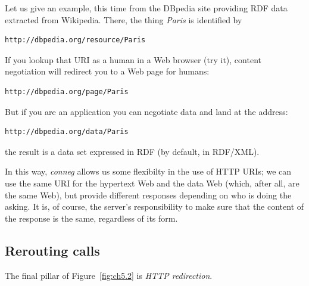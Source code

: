 Let us give an example, this time from the DBpedia site providing RDF
data extracted from Wikipedia. There, the thing \emph{Paris} is identified
by

\begin{lstlisting}
http://dbpedia.org/resource/Paris
\end{lstlisting}

If you lookup that URI as a human in a Web browser (try it), content
negotiation will redirect you to a Web page for humans:

\begin{lstlisting}
http://dbpedia.org/page/Paris
\end{lstlisting}

But if you are an application you can negotiate data and land at the
address:

\begin{lstlisting}
http://dbpedia.org/data/Paris
\end{lstlisting}

the result is a data set expressed in RDF (by default, in RDF/XML).  

In this way, \emph{conneg} allows us some flexibilty in the use of HTTP URIs;  we can use 
the same URI for the hypertext Web and the data Web (which, after all, are the same Web), but
provide different responses depending on who is doing the asking.  It is, of course, the server's responsibility to make sure that the content of the response is the same, regardless of its form. 


\hypertarget{rerouting-calls}{%
\subsection{Rerouting calls}\label{rerouting-calls}}

The final pillar of Figure~\ref{fig:ch5.2} is  \emph{HTTP redirection}.

